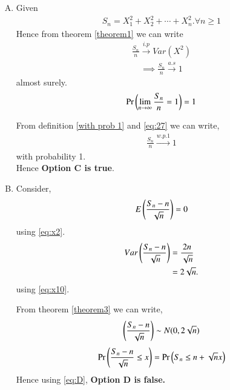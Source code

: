 \documentclass[journal,12pt,twocolumn]{IEEEtran}
\begin{document}
\begin{enumerate}[(A)]
 
 
 \item Given 
\begin{align}
    S_{n}=X_{1}^2+X_{2}^2+\cdots+X_{n}^2.\forall n\geq 1
\end{align}
Hence from theorem \ref{theorem1} we can write 
\begin{align}
    \frac{S_n}{n} \xrightarrow{i.p} Var(X^2)
\end{align}
\begin{align}
    \implies \frac{S_n}{n} \xrightarrow{a.s} 1
\end{align}
almost surely.
\begin{align}
    \Pr\left(\lim_{n\to \infty}\frac{S_n}{n}=1\right)=1\label{eq:27}
\end{align}


From definition \ref{with prob 1} and \eqref{eq:27} we can write,
\begin{align}
    \frac{S_{n}}{n} \xrightarrow{w.p.1} 1
\end{align}
with probability 1.\\
Hence \textbf{Option C is true}.



\item Consider,
\begin{align}
    E\left(\frac{S_{n}-n}{\sqrt{n}}\right)=0
\end{align}
using \eqref{eq:x2}.
\begin{align}
     Var\left(\frac{S_{n}-n}{\sqrt{n}}\right)&=\frac{2n}{\sqrt{n}}\\
     &=2\sqrt{n}.
\end{align}
using \eqref{eq:x10}.

From theorem \ref{theorem3} we can write,
\begin{align}
    \left(\frac{S_{n}-n}{\sqrt{n}}\right) \sim N(0,2 \sqrt{n})\label{eq:D}
\end{align}
\begin{align}
     \Pr{\ensuremath{\left(\frac{S_{n}-n}{\sqrt{n}} \leq x\right)}}= \Pr{\ensuremath{\left(S_{n} \leq n+\sqrt{n}x\right)}}
\end{align}
Hence using \eqref{eq:D}, \textbf{Option D is false.}
 
 \end{enumerate}
    
\end{document}
